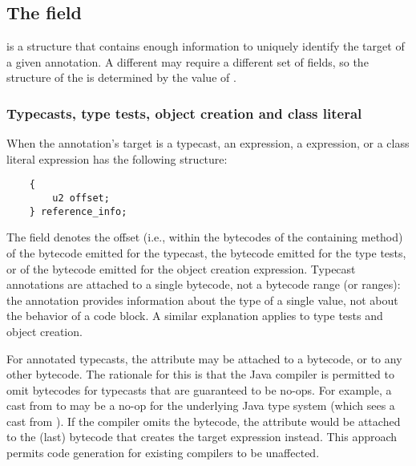\documentclass[10pt]{article}
\begin{document}
\subsection{The  field\label{class-file:ext:reference_info}}

 is a structure that contains enough information to
uniquely identify the target of a given annotation.  A different
 may require a different set of fields, so the structure
of the  is determined by the value of
.




\subsubsection{Typecasts, type tests, object creation and class literal\label{class-file:ext:ri:typecast}}

When the annotation's target is a typecast, an  expression, a  expression, or a class literal expression
 has
the following structure:

\begin{Verbatim}
    {
        u2 offset;
    } reference_info;
\end{Verbatim}

The  field denotes the offset (i.e., within the bytecodes
of the containing method) of the  bytecode emitted for
the typecast, the  bytecode emitted for the type tests, or of the  bytecode
emitted for the object creation expression.
Typecast annotations are attached to a single bytecode, not a bytecode range
(or ranges):  the annotation provides information about the type of a
single value, not about the behavior of a code block.
A similar explanation applies to type tests and object creation.

For annotated typecasts, the attribute may be attached to a
 bytecode, or to any other bytecode.  The rationale for
this is that the Java compiler is permitted to omit 
bytecodes for typecasts that are guaranteed to be no-ops.  For example, a
cast from  to  may be a no-op for the
underlying Java type system (which sees a cast from 
).  If the compiler omits the  bytecode, the
 attribute would be attached to the (last) bytecode that
creates the target expression instead.  This approach permits code
generation for existing compilers to be unaffected.
\end{document}
